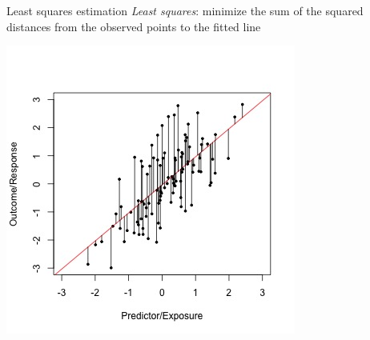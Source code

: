 \documentclass[10pt,t]{beamer}
\begin{document}
\begin{frame}{Least squares estimation}
\textit{Least squares}: minimize the sum of the squared distances from the observed points to the fitted line

\vspace{0.3cm}

\centering \includegraphics[scale=0.45]{figures/linear-regr-ls.jpg}

\end{frame}
\end{document}
